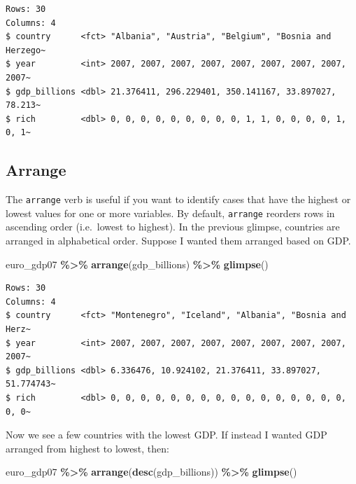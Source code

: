 \documentclass[
]{book}
\makeatletter
\newenvironment{Shaded}{\begin{snugshade}}{\end{snugshade}}
\newcommand{\FunctionTok}[1]{\textcolor[rgb]{0.27,0.27,0.27}{\textbf{#1}}}
\newcommand{\NormalTok}[1]{#1}
\newcommand{\SpecialCharTok}[1]{\textcolor[rgb]{0.43,0.43,0.43}{\textbf{#1}}}
\newenvironment{kframe}{%
\medskip{}
\setlength{\fboxsep}{.8em}
 \def\at@end@of@kframe{}%
 \ifinner\ifhmode%
  \def\at@end@of@kframe{\end{minipage}}%
  \begin{minipage}{\columnwidth}%
 \fi\fi%
 \def\FrameCommand##1{\hskip\@totalleftmargin \hskip-\fboxsep
 \colorbox{shadecolor}{##1}\hskip-\fboxsep
     \hskip-\linewidth \hskip-\@totalleftmargin \hskip\columnwidth}%
 \MakeFramed {\advance\hsize-\width
   \@totalleftmargin\z@ \linewidth\hsize
   \@setminipage}}%
 {\par\unskip\endMakeFramed%
 \at@end@of@kframe}
\renewenvironment{Shaded}{\begin{kframe}}{\end{kframe}}
\makeatother
\begin{document}
\begin{verbatim}
Rows: 30
Columns: 4
$ country      <fct> "Albania", "Austria", "Belgium", "Bosnia and Herzego~
$ year         <int> 2007, 2007, 2007, 2007, 2007, 2007, 2007, 2007, 2007~
$ gdp_billions <dbl> 21.376411, 296.229401, 350.141167, 33.897027, 78.213~
$ rich         <dbl> 0, 0, 0, 0, 0, 0, 0, 0, 0, 1, 1, 0, 0, 0, 0, 1, 0, 1~
\end{verbatim}

\hypertarget{arrange}{%
\subsection{Arrange}\label{arrange}}

The \texttt{arrange} verb is useful if you want to identify cases that have the highest or lowest values for one or more variables. By default, \texttt{arrange} reorders rows in ascending order (i.e.~lowest to highest). In the previous glimpse, countries are arranged in alphabetical order. Suppose I wanted them arranged based on GDP.

\begin{Shaded}
\begin{Highlighting}[]
\NormalTok{euro\_gdp07 }\SpecialCharTok{\%\textgreater{}\%} 
  \FunctionTok{arrange}\NormalTok{(gdp\_billions) }\SpecialCharTok{\%\textgreater{}\%} 
  \FunctionTok{glimpse}\NormalTok{()}
\end{Highlighting}
\end{Shaded}

\begin{verbatim}
Rows: 30
Columns: 4
$ country      <fct> "Montenegro", "Iceland", "Albania", "Bosnia and Herz~
$ year         <int> 2007, 2007, 2007, 2007, 2007, 2007, 2007, 2007, 2007~
$ gdp_billions <dbl> 6.336476, 10.924102, 21.376411, 33.897027, 51.774743~
$ rich         <dbl> 0, 0, 0, 0, 0, 0, 0, 0, 0, 0, 0, 0, 0, 0, 0, 0, 0, 0~
\end{verbatim}

Now we see a few countries with the lowest GDP. If instead I wanted GDP arranged from highest to lowest, then:

\begin{Shaded}
\begin{Highlighting}[]
\NormalTok{euro\_gdp07 }\SpecialCharTok{\%\textgreater{}\%} 
  \FunctionTok{arrange}\NormalTok{(}\FunctionTok{desc}\NormalTok{(gdp\_billions)) }\SpecialCharTok{\%\textgreater{}\%} 
  \FunctionTok{glimpse}\NormalTok{()}
\end{Highlighting}
\end{Shaded}
\end{document}
